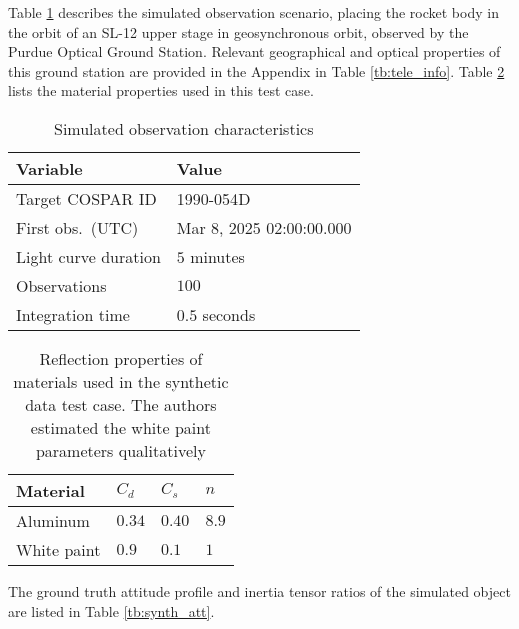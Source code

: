 \documentclass[a4paper,twocolumn]{spaceDebrisC} %
\begin{document}
Table \ref{tb:case1_in} describes the simulated observation scenario, placing the rocket body in the orbit of an SL-12 upper stage in geosynchronous orbit, observed by the Purdue Optical Ground Station. Relevant geographical and optical properties of this ground station are provided in the Appendix in Table \ref{tb:tele_info}. Table \ref{tb:synth_matprops} lists the material properties used in this test case.

\begin{table}[H]
  \centering
  \caption{Simulated observation characteristics}
  \vspace*{6pt}
  \begin{tabular}{|l|l|}
  \hline
  \textbf{Variable} & \textbf{Value} \\ \hline
 Target COSPAR ID & 1990-054D \\ \hline
 First obs.\ (UTC) & Mar 8, 2025 02:00:00.000 \\ \hline
 Light curve duration & $5$ minutes \\ \hline
 Observations & $100$ \\ \hline
 Integration time & $0.5$ seconds \\ \hline
  \end{tabular}
  \label{tb:case1_in}
\end{table}

\begin{table}[H]
  \centering
  \caption{Reflection properties of materials used in the synthetic data test case. The authors estimated the white paint parameters qualitatively}
  \vspace*{6pt}
  \begin{tabular}{|l|l|l|l|}
  \hline
  \textbf{Material} & $C_d$ & $C_s$ & $n$ \\ \hline
 Aluminum \cite{fankhauser2023} & $0.34$ & $0.40$ & $8.9$ \\ \hline
 White paint & $0.9$ & $0.1$ & $1$ \\ \hline
  \end{tabular}
  \label{tb:synth_matprops}
\end{table}

The ground truth attitude profile and inertia tensor ratios of the simulated object are listed in Table \ref{tb:synth_att}.
\end{document}
